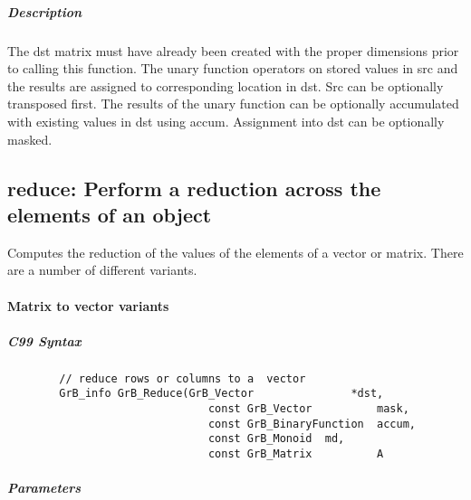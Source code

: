 \subparagraph{Description}

The dst matrix must have already been created with the proper dimensions
prior to calling this function.  The unary function operators on stored values in src and the results are assigned to corresponding location in dst.
Src can be optionally transposed first.  The results of the unary function can be optionally accumulated with existing values in dst using accum.  Assignment into dst can be optionally masked.


\subsection{{\sf reduce}: Perform a reduction across the elements of an object}

Computes the reduction of the values of the elements of a vector or matrix.  There are a number of different variants.

\paragraph{Matrix to vector variants}

\subparagraph{C99 Syntax}

\begin{verbatim}
        // reduce rows or columns to a  vector
        GrB_info GrB_Reduce(GrB_Vector               *dst,
                               const GrB_Vector          mask,
                               const GrB_BinaryFunction  accum,
                               const GrB_Monoid  md,  
                               const GrB_Matrix          A
         \end{verbatim}

\subparagraph{Parameters}

